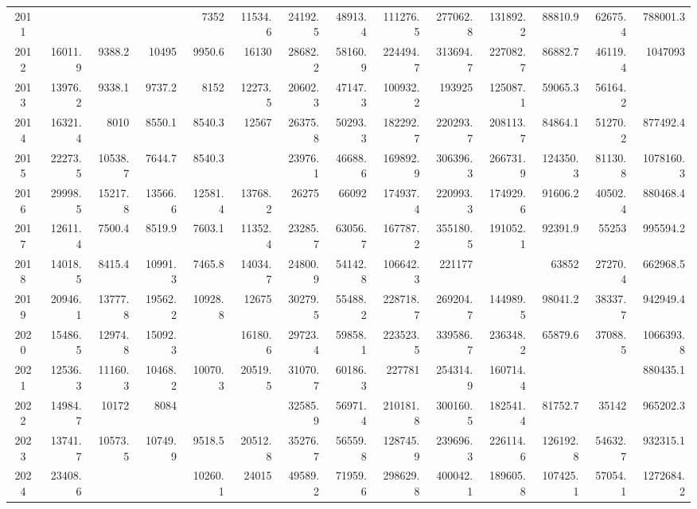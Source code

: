 \begin{longtable}[t]{crrrrrrrrrrrrr}
2011 & \cellcolor{green}{10899.4} & \cellcolor{green}{7068} & \cellcolor{green}{6323.6} & 7352 & 11534.6 & 24192.5 & 48913.4 & 111276.5 & 277062.8 & 131892.2 & 88810.9 & 62675.4 & 788001.3\\
2012 & 16011.9 & 9388.2 & 10495 & 9950.6 & 16130 & 28682.2 & 58160.9 & 224494.7 & 313694.7 & 227082.7 & 86882.7 & 46119.4 & 1047093\\
2013 & 13976.2 & 9338.1 & 9737.2 & 8152 & 12273.5 & 20602.3 & 47147.3 & 100932.2 & 193925 & 125087.1 & 59065.3 & 56164.2 & \cellcolor{green}{656400.5}\\
2014 & 16321.4 & 8010 & 8550.1 & 8540.3 & 12567 & 26375.8 & 50293.3 & 182292.7 & 220293.7 & 208113.7 & 84864.1 & 51270.2 & 877492.4\\
2015 & 22273.5 & 10538.7 & 7644.7 & 8540.3 & \cellcolor{green}{9996.1} & 23976.1 & 46688.6 & 169892.9 & 306396.3 & 266731.9 & 124350.3 & 81130.8 & 1078160.3\\
2016 & 29998.5 & 15217.8 & 13566.6 & 12581.4 & 13768.2 & 26275 & 66092 & 174937.4 & 220993.3 & 174929.6 & 91606.2 & 40502.4 & 880468.4\\
2017 & 12611.4 & 7500.4 & 8519.9 & 7603.1 & 11352.4 & 23285.7 & 63056.7 & 167787.2 & 355180.5 & 191052.1 & 92391.9 & 55253 & 995594.2\\
2018 & 14018.5 & 8415.4 & 10991.3 & 7465.8 & 14034.7 & 24800.9 & 54142.8 & 106642.3 & 221177 & \cellcolor{green}{110157.4} & 63852 & 27270.4 & 662968.5\\
2019 & 20946.1 & 13777.8 & 19562.2 & 10928.8 & 12675 & 30279.5 & 55488.2 & 228718.7 & 269204.7 & 144989.5 & 98041.2 & 38337.7 & 942949.4\\
2020 & 15486.5 & 12974.8 & 15092.3 & \cellcolor{red}{14651.6} & 16180.6 & 29723.4 & 59858.1 & 223523.5 & 339586.7 & 236348.2 & 65879.6 & 37088.5 & 1066393.8\\
2021 & 12536.3 & 11160.3 & 10468.2 & 10070.3 & 20519.5 & 31070.7 & 60186.3 & 227781 & 254314.9 & 160714.4 & \cellcolor{green}{57448.6} & \cellcolor{green}{24164.5} & 880435.1\\
2022 & 14984.7 & 10172 & 8084 & \cellcolor{green}{7349} & \cellcolor{red}{25276.9} & 32585.9 & 56971.4 & 210181.8 & 300160.5 & 182541.4 & 81752.7 & 35142 & 965202.3\\
2023 & 13741.7 & 10573.5 & 10749.9 & 9518.5 & 20512.8 & 35276.7 & 56559.8 & 128745.9 & 239696.3 & 226114.6 & 126192.8 & 54632.7 & 932315.1\\
2024 & 23408.6 & \cellcolor{red}{20344.7} & \cellcolor{red}{20350.2} & 10260.1 & 24015 & 49589.2 & 71959.6 & 298629.8 & 400042.1 & 189605.8 & 107425.1 & 57054.1 & 1272684.2\\

\end{longtable}
